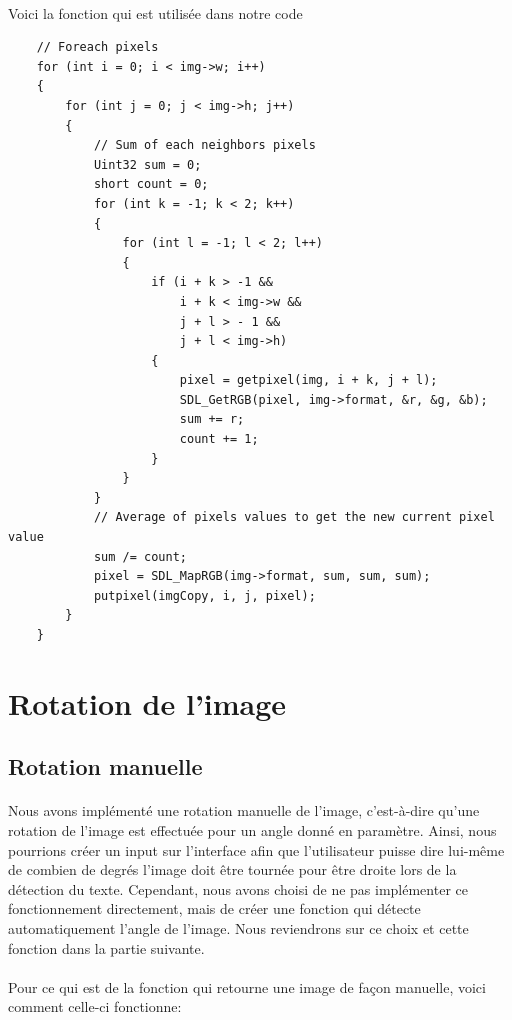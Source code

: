 \documentclass{article}
\begin{document}
\paragraph{}Voici la fonction qui est utilisée dans notre code

\begin{lstlisting}
	// Foreach pixels
    for (int i = 0; i < img->w; i++)
    {
        for (int j = 0; j < img->h; j++)
        {
            // Sum of each neighbors pixels
            Uint32 sum = 0;
            short count = 0;
            for (int k = -1; k < 2; k++)
            {
                for (int l = -1; l < 2; l++)
                {
                    if (i + k > -1 && 
                        i + k < img->w && 
                        j + l > - 1 && 
                        j + l < img->h) 
                    {
                        pixel = getpixel(img, i + k, j + l);
                        SDL_GetRGB(pixel, img->format, &r, &g, &b);
                        sum += r;
                        count += 1;
                    }
                }
            }
            // Average of pixels values to get the new current pixel value
            sum /= count;
            pixel = SDL_MapRGB(img->format, sum, sum, sum);
            putpixel(imgCopy, i, j, pixel);
        }
    }
\end{lstlisting}

\section{Rotation de l'image}
\subsection{Rotation manuelle}
\paragraph{}
Nous avons implémenté une rotation manuelle de l'image, c'est-à-dire qu'une rotation de l'image est effectuée pour un angle donné en paramètre. Ainsi, nous pourrions créer un input sur l'interface afin que l'utilisateur puisse dire lui-même de combien de degrés l'image doit être tournée pour être droite lors de la détection du texte. Cependant, nous avons choisi de ne pas implémenter ce fonctionnement directement, mais de créer une fonction qui détecte automatiquement l'angle de l'image. Nous reviendrons sur ce choix et cette fonction dans la partie suivante.

\paragraph{}
Pour ce qui est de la fonction qui retourne une image de façon manuelle, voici comment celle-ci fonctionne: \\
\end{document}
